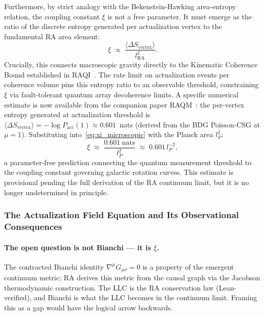 \documentclass[11pt,a4paper]{article}
\theoremstyle{plain}
\theoremstyle{definition}
\theoremstyle{remark}
\begin{document}
\begin{description}
Furthermore, by strict analogy with the Bekenstein-Hawking area-entropy
relation, the coupling constant $\xi$ is not a free parameter. It must emerge
as the ratio of the discrete entropy generated per actualization vertex to the
fundamental RA area element:
\begin{equation}
  \xi \;\propto\; \frac{\langle\Delta S_{\mathrm{vertex}}\rangle}{l_{\mathrm{RA}}^2}.
  \label{eq:xi_microscopic}
\end{equation}
Crucially, this connects macroscopic gravity directly to the Kinematic Coherence
Bound established in RAQI~\citep{Sandeman2026RAQI}. The rate limit on
actualization events per coherence volume pins this entropy ratio to an
observable threshold, constraining $\xi$ via fault-tolerant quantum array
decoherence limits.
A specific numerical estimate is now available from the companion paper
RAQM~\citep{Sandeman2026RAQM}: the per-vertex entropy generated at
actualization threshold is $\langle\Delta S_{\mathrm{vertex}}\rangle
= -\log P_{\mathrm{acc}}(1) \approx 0.601$~nats (derived from the
BDG Poisson-CSG at $\mu=1$). Substituting into~\eqref{eq:xi_microscopic}
with the Planck area $l_P^2$:
\begin{equation}
  \xi \;\approx\; \frac{0.601~\text{nats}}{l_P^2}
  \;\approx\; 0.601\,l_P^{-2},
  \label{eq:xi_numerical}
\end{equation}
a parameter-free prediction connecting the quantum measurement threshold
to the coupling constant governing galactic rotation curves.
This estimate is provisional pending the full derivation of the RA
continuum limit, but it is no longer undetermined in principle.

\subsubsection*{The Actualization Field Equation and Its Observational Consequences}

\paragraph{The open question is not Bianchi — it is $\xi$.}
The contracted Bianchi identity $\nabla^\mu G_{\mu\nu} = 0$ is a property of
the emergent continuum metric; RA derives this metric from the causal graph via
the Jacobson thermodynamic construction. The LLC is the RA conservation law
(Lean-verified), and Bianchi is what the LLC becomes in the continuum limit.
Framing this as a gap would have the logical arrow backwards.


\end{description}
\end{document}
